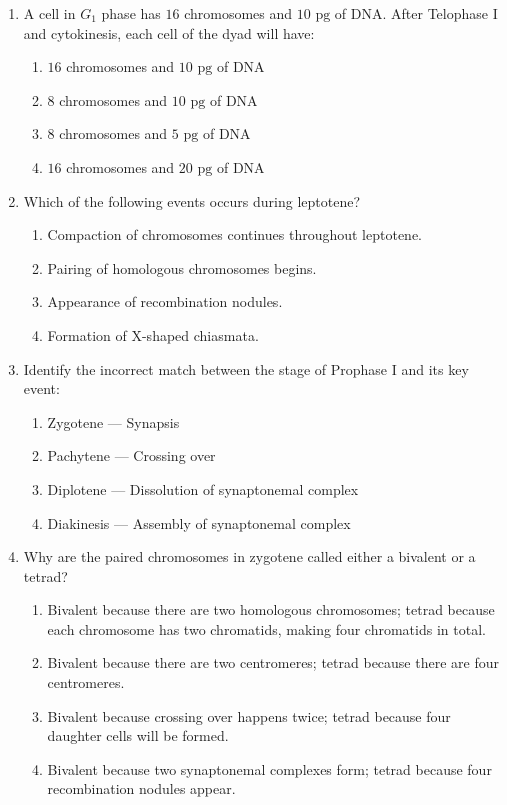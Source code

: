 \documentclass[11pt,a4paper]{article}
\begin{document}
\begin{enumerate}[label=\textbf{\arabic*.}]
\item A cell in $G_1$ phase has $16$ chromosomes and $10\text{ pg}$ of DNA. After Telophase I and cytokinesis, each cell of the dyad will have:
\begin{enumerate}[label=(\Alph*)]
    \item $16$ chromosomes and $10\text{ pg}$ of DNA
    \item $8$ chromosomes and $10\text{ pg}$ of DNA
    \item $8$ chromosomes and $5\text{ pg}$ of DNA
    \item $16$ chromosomes and $20\text{ pg}$ of DNA
\end{enumerate}

\item Which of the following events occurs during leptotene?
\begin{enumerate}[label=(\Alph*)]
    \item Compaction of chromosomes continues throughout leptotene.
    \item Pairing of homologous chromosomes begins.
    \item Appearance of recombination nodules.
    \item Formation of X-shaped chiasmata.
\end{enumerate}

\item Identify the incorrect match between the stage of Prophase I and its key event:
\begin{enumerate}[label=(\Alph*)]
    \item Zygotene — Synapsis
    \item Pachytene — Crossing over
    \item Diplotene — Dissolution of synaptonemal complex
    \item Diakinesis — Assembly of synaptonemal complex
\end{enumerate}

\item Why are the paired chromosomes in zygotene called either a bivalent or a tetrad?
\begin{enumerate}[label=(\Alph*)]
    \item Bivalent because there are two homologous chromosomes; tetrad because each chromosome has two chromatids, making four chromatids in total.
    \item Bivalent because there are two centromeres; tetrad because there are four centromeres.
    \item Bivalent because crossing over happens twice; tetrad because four daughter cells will be formed.
    \item Bivalent because two synaptonemal complexes form; tetrad because four recombination nodules appear.
\end{enumerate}


\end{enumerate}
\end{document}
